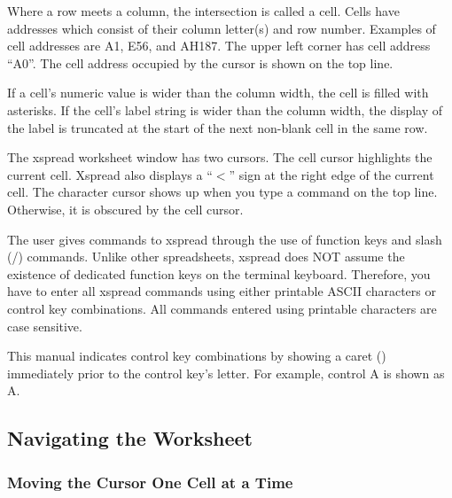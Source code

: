     Where a row meets a column, the intersection is called a cell.  Cells have 
addresses which consist of their column letter(s) and row number.  Examples of 
cell addresses are A1, E56, and AH187.  The upper left corner has cell address 
``A0''.  The cell address occupied by the cursor is shown on the top line.

    If a cell's numeric value is wider than the column width, the cell is 
filled with asterisks.  If the cell's label string is wider than the column 
width, the display of the label is truncated at the start of the next 
non-blank cell in the same row.

    The xspread worksheet window has two cursors.  The cell cursor highlights 
the current cell.  Xspread also displays a ``$<$'' sign at the right edge of the
current cell.  The character cursor shows up when you type a command on the 
top line.  Otherwise, it is obscured by the cell cursor.

    The user gives commands to xspread through the use of function keys and 
slash (/) commands.  Unlike other spreadsheets, xspread does NOT assume the 
existence of dedicated function keys on the terminal keyboard.  Therefore, you 
have to enter all xspread commands using either printable ASCII characters or 
control key combinations.  All commands entered using printable characters are 
case sensitive.

    This manual indicates control key combinations by showing a caret (\ctrl ) 
immediately prior to the control key's letter.  For example, control A is 
shown as \ctrl A.

\subsection*{Navigating the Worksheet}

\subsubsection*{Moving the Cursor One Cell at a Time}

